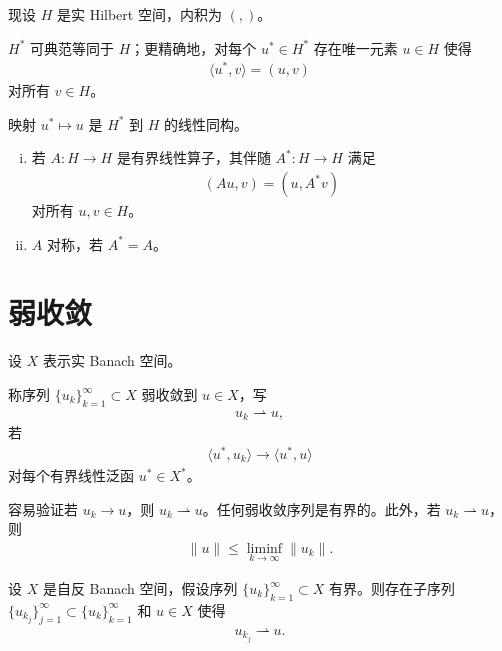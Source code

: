 \documentclass[../main.tex]{subfiles}
\begin{document}
现设 $H$ 是实 Hilbert 空间，内积为 $(,)$。

\begin{theorem}\label{theorem:appD-Riesz}$H^*$ 可典范等同于 $H$；更精确地，对每个 $u^*\in H^*$ 存在唯一元素 $u\in H$ 使得
\begin{align*}
\langle u^*,v\rangle=(u,v)
\end{align*}
对所有 $v\in H$。
\end{theorem}

映射 $u^*\mapsto u$ 是 $H^*$ 到 $H$ 的线性同构。

\begin{definition}\label{definition:appD-伴随}
\begin{enumerate}[(i)]
\item 若 $A:H\to H$ 是有界线性算子，其伴随 $A^*:H\to H$ 满足
\begin{align*}
(Au,v)=(u,A^*v)
\end{align*}
对所有 $u,v\in H$。

\item $A$ 对称，若 $A^*=A$。
\end{enumerate}
\end{definition}

\section{弱收敛}\label{section:appD-弱收敛}

设 $X$ 表示实 Banach 空间。

\begin{definition}\label{definition:appD-弱收敛}
称序列 $\{u_k\}_{k=1}^\infty\subset X$ 弱收敛到 $u\in X$，写
\begin{align*}
u_k\rightharpoonup u,
\end{align*}
若
\begin{align*}
\langle u^*,u_k\rangle\to\langle u^*,u\rangle
\end{align*}
对每个有界线性泛函 $u^*\in X^*$。
\end{definition}

容易验证若 $u_k\to u$，则 $u_k\rightharpoonup u$。任何弱收敛序列是有界的。此外，若 $u_k\rightharpoonup u$，则
\begin{align*}
\|u\|\leqslant\liminf_{k\to\infty}\|u_k\|.
\end{align*}

\begin{theorem}[弱紧性。]\label{theorem:appD-弱紧}设 $X$ 是自反 Banach 空间，假设序列 $\{u_k\}_{k=1}^\infty\subset X$ 有界。则存在子序列 $\{u_{k_j}\}_{j=1}^\infty\subset\{u_k\}_{k=1}^\infty$ 和 $u\in X$ 使得
\begin{align*}
u_{k_j}\rightharpoonup u.
\end{align*}
\end{theorem}
\end{document}
